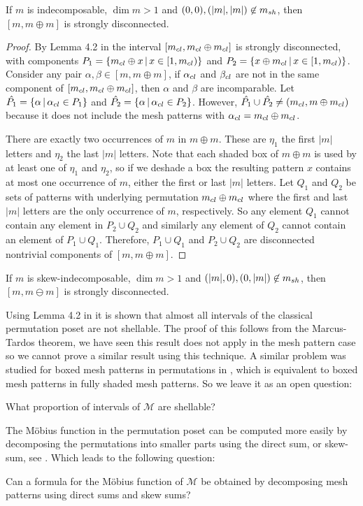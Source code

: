 \documentclass[11pt,a4paper,oneside]{article}
\begin{document}
\begin{lem}
If $m$ is indecomposable, $\dim m > 1$ and $(0,0),(|m|,|m|)\not\in m_{sh}$, then
$[m,m\oplus m]$ is strongly disconnected.
\begin{proof}
By Lemma 4.2 in \cite{McSt13} the interval $[m_{cl},m_{cl}\oplus m_{cl}]$ is strongly disconnected,
with components $P_1=\{m_{cl}\oplus x\,|\,x\in [1,m_{cl})\}$ and
$P_2=\{x\oplus m_{cl}\,|\,x\in [1,m_{cl})\}$. Consider any pair $\alpha,\beta\in[m,m\oplus m]$,
if $\alpha_{cl}$ and $\beta_{cl}$ are not in the same component of  $[m_{cl},m_{cl}\oplus m_{cl}]$,
then $\alpha$ and $\beta$ are incomparable. Let $\hat{P_1}=\{\alpha\,|\,\alpha_{cl}\in P_1\}$
and $\hat{P_2}=\{\alpha\,|\,\alpha_{cl}\in P_2\}$. However, $\hat{P_1}\cup\hat{P_2}\not=(m_{cl},m\oplus m_{cl})$
because it does not include the mesh patterns with $\alpha_{cl}=m_{cl}\oplus m_{cl}$.

There are exactly two occurrences of $m$ in $m\oplus m$. These are $\eta_1$ the first $|m|$ letters
and $\eta_2$ the last $|m|$ letters. Note that each shaded box of $m\oplus m$ is used by at least one
of $\eta_1$ and $\eta_2$, so if we deshade a box the resulting pattern $x$ contains at most one occurrence of $m$,
either the first or last $|m|$ letters. Let $Q_1$ and $Q_2$ be sets of patterns with underlying permutation
$m_{cl}\oplus m_{cl}$ where the first and last $|m|$ letters are the only occurrence of $m$, respectively. So any
element $Q_1$ cannot contain any element in $P_2\cup Q_2$ and similarly any element of $Q_2$ cannot
contain an element of $P_1\cup Q_1$. Therefore, $P_1\cup Q_1$ and $P_2\cup Q_2$ are disconnected nontrivial components of
$[m,m\oplus m]$.
\end{proof}
\end{lem}
\begin{cor}
If $m$ is skew-indecomposable, $\dim m>1$ and $(|m|,0),(0,|m|)\not\in m_{sh}$, then
$[m,m\ominus m]$ is strongly disconnected.
\end{cor}

Using Lemma 4.2 in \cite{McSt13} it is shown that
almost all intervals of the classical permutation poset are not shellable. The
proof of this follows from the Marcus-Tardos theorem, we have seen this result
does not apply in the mesh pattern case so we cannot prove a similar result
using this technique.  A similar problem was studied for boxed mesh patterns in
permutations in \cite{AKV13}, which is equivalent to boxed mesh patterns in
fully shaded mesh patterns. So we leave it as an open question:

\begin{que}
What proportion of intervals of $\mathcal{M}$ are shellable?
\end{que}

The M\"obius function in the permutation poset can be computed more easily by decomposing the
permutations into smaller parts using the direct sum, or skew-sum, see \cite{BJJS11,McSt13}. Which
leads to the following question:
\begin{que}
Can a formula for the M\"obius function of $\mathcal{M}$ be obtained by decomposing mesh patterns
using direct sums and skew sums?
\end{que}



\end{document}
